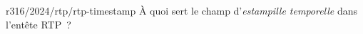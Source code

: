\begin{question}{r316/2024/rtp/rtp-timestamp}
  À quoi sert le champ d'{\em estampille temporelle} dans l'entête
  RTP~?
  \begin{reponses}[2]
  \end{reponses}
\end{question}
